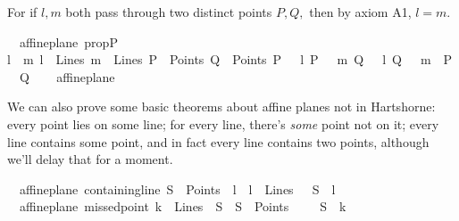 \begin{isabellebody}
\begin{isamarkuptext}
\begin{hartshorne}
\proof For if $l, m$ both pass through two distinct points $P, Q,$ then by axiom A1, $l = m.$ \endproof
\end{hartshorne}%
\end{isamarkuptext}\isamarkuptrue%
\isamarkupfalse%
\ {\isacharparenleft}{\kern0pt}\ affine{\isacharunderscore}{\kern0pt}plane{\isacharparenright}{\kern0pt}\ prop{}P{}{\isacharcolon}{\kern0pt}\ \isanewline
{\isachardoublequoteopen}{\isasymlbrakk}l\ {\isasymnoteq}\ m{\isacharsemicolon}{\kern0pt}\ l\ {\isasymin}\ Lines{\isacharsemicolon}{\kern0pt}\ m\ {\isasymin}\ Lines{\isacharsemicolon}{\kern0pt}\ P\ {\isasymin}\ Points{\isacharsemicolon}{\kern0pt}\ Q\ {\isasymin}\ Points{\isacharsemicolon}{\kern0pt}\ P\ {\isasymlhd}\ \ l{\isacharsemicolon}{\kern0pt}\ P\ {\isasymlhd}\ \ m{\isacharsemicolon}{\kern0pt}\ Q\ {\isasymlhd}\ \ l{\isacharsemicolon}{\kern0pt}\ Q\ {\isasymlhd}\ \ m{\isasymrbrakk}\ {\isasymLongrightarrow}\ P\ {\isacharequal}{\kern0pt}\ Q{\isachardoublequoteclose}\isanewline
%
\isadelimproof
\ \ %
\endisadelimproof
%
\isatagproof
{}\isamarkupfalse%
%
\endisatagproof
{\isafoldproof}%
%
\isadelimproof
\isanewline
%
\endisadelimproof
\isanewline
{}\isamarkupfalse%
\ affine{\isacharunderscore}{\kern0pt}plane%
\begin{isamarkuptext}%
\daniel
We can also prove some basic theorems about affine planes not in Hartshorne: every
point lies on some line; for every line, there's \emph{some} point not on it; every line contains some point, and in fact every line 
contains two points, although we'll delay that for a moment. \done%
\end{isamarkuptext}\isamarkuptrue%
\isamarkupfalse%
\ {\isacharparenleft}{\kern0pt}\ affine{\isacharunderscore}{\kern0pt}plane{\isacharparenright}{\kern0pt}\ containing{\isacharunderscore}{\kern0pt}line{\isacharcolon}{\kern0pt}\ {\isachardoublequoteopen}S\ {\isasymin}\ Points\ {\isasymLongrightarrow}\ {\isacharparenleft}{\kern0pt}{\isasymexists}l\ {\isachardot}{\kern0pt}\ {\isacharparenleft}{\kern0pt}l\ {\isasymin}\ Lines\ {\isasymand}\ \ S\ {\isasymlhd}\ l{\isacharparenright}{\kern0pt}{\isacharparenright}{\kern0pt}{\isachardoublequoteclose}\isanewline
%
\isadelimproof
\ \ %
\endisadelimproof
%
\isatagproof
{}\isamarkupfalse%
%
\endisatagproof
{\isafoldproof}%
%
\isadelimproof
\isanewline
%
\endisadelimproof
\isanewline
{}\isamarkupfalse%
\ {\isacharparenleft}{\kern0pt}\ affine{\isacharunderscore}{\kern0pt}plane{\isacharparenright}{\kern0pt}\ missed{\isacharunderscore}{\kern0pt}point{\isacharcolon}{\kern0pt}\ {\isachardoublequoteopen}k\ {\isasymin}\ Lines\ {\isasymLongrightarrow}\ {\isacharparenleft}{\kern0pt}{\isasymexists}S\ {\isachardot}{\kern0pt}\ {\isacharparenleft}{\kern0pt}S\ {\isasymin}\ Points\ {\isasymand}\ {\isacharparenleft}{\kern0pt}\ {\isasymnot}\ \ S\ {\isasymlhd}\ k{\isacharparenright}{\kern0pt}{\isacharparenright}{\kern0pt}{\isacharparenright}{\kern0pt}{\isachardoublequoteclose}\ \isanewline

\end{isabellebody}
